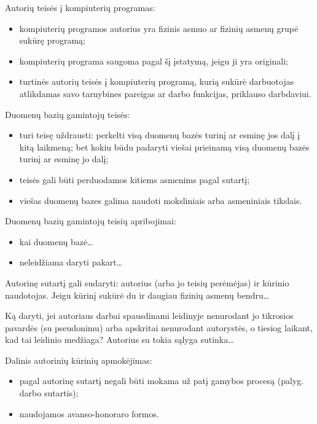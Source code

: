 Autorių teisės į kompiuterių programas:
\begin{itemize}
  \item kompiuterių programos autorius yra fizinis asmuo ar fizinių
    asmenų grupė sukūrę programą;
  \item kompiuterių programa saugoma pagal šį įstatymą, jeigu ji yra
    originali;
  \item turtinės autorių teisės į kompiuterių programą, kurią sukūrė
    darbuotojas atlikdamas savo tarnybines pareigas ar darbo funkcijas,
    priklauso darbdaviui.
\end{itemize}

Duomenų bazių gamintojų teisės:
\begin{itemize}
  \item turi teisę uždrausti: perkelti visą duomenų bazės turinį ar esminę
    jos dalį į kitą laikmeną; bet kokiu būdu padaryti viešai
    prieinamą visą duomenų bazės turinį ar esminę jo dalį;
  \item teisės gali būti perduodamos kitiems asmenims pagal sutartį;
  \item viešas duomenų bazes galima naudoti moksliniais arba
    asmeniniais tikslais.
\end{itemize}

Duomenų bazių gamintojų teisių apribojimai:
\begin{itemize}
  \item kai duomenų bazė…
  \item neleidžiama daryti pakart…
\end{itemize}

Autorinę sutartį gali sudaryti: autorius (arba jo teisių perėmėjas) ir
kūrinio naudotojas. Jeigu kūrinį sukūrė du ir daugiau fizinių
asmenų bendru…

\begin{exmp}
  Ką daryti, jei autoriaus darbai spausdinami leidinyje nenurodant jo
  tikrosios pavardės (su pseudonimu) arba apskritai nenurodant
  autorystės, o tiesiog laikant, kad tai leidinio medžiaga? Autorius
  su tokia sąlyga sutinka…
\end{exmp}

Dalinis autorinių kūrinių apmokėjimas:
\begin{itemize}
  \item pagal autorinę sutartį negali būti mokama už patį gamybos
    procesą (palyg. darbo sutartis);
  \item naudojamos avanso-honoraro formos.
\end{itemize}

